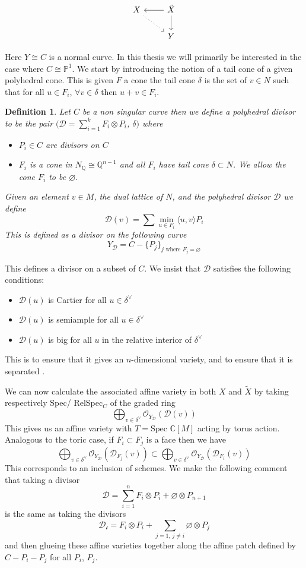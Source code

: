 \documentclass[11pt]{amsart}
\theoremstyle{plain}
\newtheorem{dfn}[thm]{Definition}
\begin{document}
\[
\begin{tikzcd}
X \arrow[rd, dotted] & \tilde{X} \arrow[l] \arrow[d]\\
& Y
\end{tikzcd}
\]

Here $Y \cong C$ is a normal curve. In this thesis we will primarily be interested in the case where $C \cong \mathbb{P}^1$. We start by introducing the notion of a tail cone of a given polyhedral cone. This is given $F$ a cone the tail cone $\delta$ is the set of $v \in N$ such that for all $u \in F_i$, $ \forall v \in \delta$ then $u+v \in F_i$.
\begin{dfn}
Let $C$ be a non singular curve then we define a polyhedral divisor to be the pair $(\mathcal{D} = \sum_{i = 1}^k F_i \otimes P_i$, $\delta)$ where
\begin{itemize}
\item $P_i \in C$ are divisors on $C$ 
\item $F_i$ is a cone in $N_\mathbb{Q} \cong \mathbb{Q}^{n-1}$ and all $F_i$ have tail cone $\delta \subset N$.  We allow the cone $F_i$ to be $\varnothing$.
\end{itemize}
Given an element $v \in M$, the dual lattice of $N$, and the polyhedral divisor $\mathcal{D}$ we define
\[
\mathcal{D}(v) = \sum \min_{u \in F_i} \langle u, v \rangle P_i
\]
This is defined as a divisor on the following curve
\[
Y_\mathcal{D} = C - \{P_j\}_{j \text{ where } F_j = \varnothing}
\]
\end{dfn}

This defines a divisor on a subset of $C$. We insist that $\mathcal{D}$ satisfies the following conditions:
\begin{itemize} 
\item $\mathcal{D}(u)$ is Cartier for all $u \in \delta^\vee $
\item $\mathcal{D}(u)$ is semiample for all $u \in \delta^\vee$
\item $\mathcal{D}(u)$ is big for all $u$ in the relative interior of $\delta^\vee$
\end{itemize}
This is to ensure that it gives an $n$-dimensional variety, and to ensure that it is separated \cite{PS}.


We can now calculate the associated affine variety in both $X$ and $\tilde{X}$ by taking respectively Spec/ RelSpec${_C}$ of the graded ring
\[
\bigoplus_{v \in \delta^\vee} \mathcal{O}_{Y_\mathcal{D}} ( \mathcal{D}(v))
\]
This gives us an affine variety with $T = \text{Spec } \mathbb{C}[M]$ acting by torus action. Analogous to the toric case, if $F_i \subset F_j$ is a face then we have
\[
\bigoplus_{v \in \delta^\vee} \mathcal{O}_{Y_\mathcal{D}}( \mathcal{D}_{F_j}(v)) \subset \bigoplus_{v \in \delta^\vee} \mathcal{O}_{Y_\mathcal{D}}( \mathcal{D}_{F_i}(v)) 
\]
This corresponds to an inclusion of schemes. We make the following comment that taking a divisor 
\[ 
\mathcal{D} = \sum_{i = 1}^n F_i \otimes P_i + \varnothing \otimes P_{n+1}
\]
is the same as taking the divisors 
\[
\mathcal{D_i} = F_i \otimes P_i  + \sum_{j=1, \, j \neq i} \varnothing \otimes P_j
\]
and then glueing these affine varieties together along the affine patch defined by $C-P_i - P_j$ for all $P_i$, $P_j$.
\end{document}
